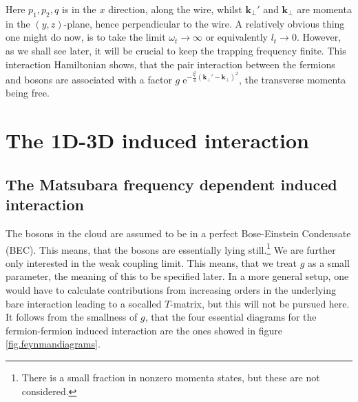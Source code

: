 Here  $p_1,p_2,q$ is in the $x$ direction, along the wire, whilst $\mathbf{k}_\perp'$ and $\mathbf{k}_\perp$ are momenta in the $(y,z)$-plane, hence perpendicular to the wire. A relatively obvious thing one might do now, is to take the limit $\omega_t \to \infty$ or equivalently $l_t \to 0$. However, as we shall see later, it will be crucial to keep the trapping frequency finite. This interaction Hamiltonian shows, that the pair interaction between the fermions and bosons are associated with a factor $g\; \text{e}^{-\frac{l_t^2}{4}(\mathbf{k}_\perp'-\mathbf{k}_\perp)^2}$, the transverse momenta being free. 

\section{The 1D-3D induced interaction}
\subsection{The Matsubara frequency dependent induced interaction}
The bosons in the cloud are assumed to be in a perfect Bose-Einstein Condensate (BEC). This means, that the bosons are essentially lying still.\footnote{There is a small fraction in nonzero momenta states, but these are not considered.}  We are further only interested in the weak coupling limit. This means, that we treat $g$ as a small parameter, the meaning of this to be specified later. In a more general setup, one would have to calculate contributions from increasing orders in the underlying bare interaction leading to a socalled $T$-matrix, but this will not be pursued here. It follows from the smallness of $g$, that the four essential diagrams for the fermion-fermion induced interaction are the ones showed in figure \ref{fig.feynmandiagrams}. 

